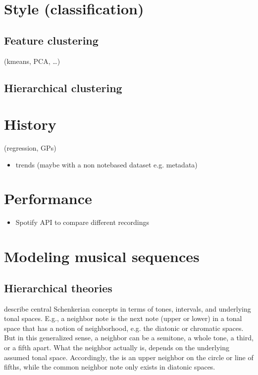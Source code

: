 \documentclass[letterpaper,10pt,english]{sphinxmanual}
\begin{document}
\section{Style (classification)}
\label{\detokenize{6_advanced:style-classification}}

\subsection{Feature clustering}
\label{\detokenize{6_advanced:feature-clustering}}
\sphinxAtStartPar
(k\sphinxhyphen{}means, PCA, …)


\subsection{Hierarchical clustering}
\label{\detokenize{6_advanced:hierarchical-clustering}}

\section{History}
\label{\detokenize{6_advanced:history}}
\sphinxAtStartPar
(regression, GPs)
\begin{itemize}
\item {} 
\sphinxAtStartPar
trends (maybe with a non note\sphinxhyphen{}based dataset e.g. metadata)

\end{itemize}


\section{Performance}
\label{\detokenize{6_advanced:performance}}\begin{itemize}
\item {} 
\sphinxAtStartPar
Spotify API to compare different recordings

\end{itemize}


\section{Modeling musical sequences}
\label{\detokenize{6_advanced:modeling-musical-sequences}}

\subsection{Hierarchical theories}
\label{\detokenize{6_advanced:hierarchical-theories}}
\sphinxAtStartPar
describe central Schenkerian concepts in terms
of tones, intervals, and underlying tonal spaces.
E.g., a neighbor note is the next note (upper or lower)
in a tonal space that has a notion of neighborhood, e.g.
the diatonic or chromatic spaces. But in this generalized sense,
a neighbor can be a semitone, a whole tone, a third, or a fifth
apart. What the neighbor actually is, depends on the underlying
assumed tonal space. Accordingly, the  is an upper
neighbor on the circle or line of fifths, while the common neighbor note
only exists in diatonic spaces.
\end{document}
